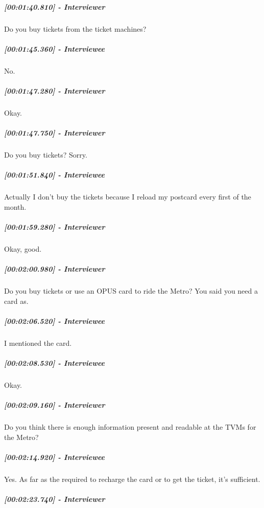 \documentclass[a4paper,12pt]{article}
\begin{document}
\hypertarget{interviewer-16}{%
\subparagraph{{[}00:01:40.810{]} - Interviewer}\label{interviewer-16}}

Do you buy tickets from the ticket machines?

\hypertarget{interviewee-9}{%
\subparagraph{{[}00:01:45.360{]} - Interviewee}\label{interviewee-9}}

No.

\hypertarget{interviewer-17}{%
\subparagraph{{[}00:01:47.280{]} - Interviewer}\label{interviewer-17}}

Okay.

\hypertarget{interviewer-18}{%
\subparagraph{{[}00:01:47.750{]} - Interviewer}\label{interviewer-18}}

Do you buy tickets? Sorry.

\hypertarget{interviewee-10}{%
\subparagraph{{[}00:01:51.840{]} - Interviewee}\label{interviewee-10}}

Actually I don't buy the tickets because I reload my postcard every
first of the month.

\hypertarget{interviewer-19}{%
\subparagraph{{[}00:01:59.280{]} - Interviewer}\label{interviewer-19}}

Okay, good.

\hypertarget{interviewer-20}{%
\subparagraph{{[}00:02:00.980{]} - Interviewer}\label{interviewer-20}}

Do you buy tickets or use an OPUS card to ride the Metro? You said you
need a card as.

\hypertarget{interviewee-11}{%
\subparagraph{{[}00:02:06.520{]} - Interviewee}\label{interviewee-11}}

I mentioned the card.

\hypertarget{interviewee-12}{%
\subparagraph{{[}00:02:08.530{]} - Interviewee}\label{interviewee-12}}

Okay.

\hypertarget{interviewer-21}{%
\subparagraph{{[}00:02:09.160{]} - Interviewer}\label{interviewer-21}}

Do you think there is enough information present and readable at the
TVMs for the Metro?

\hypertarget{interviewee-13}{%
\subparagraph{{[}00:02:14.920{]} - Interviewee}\label{interviewee-13}}

Yes. As far as the required to recharge the card or to get the ticket,
it's sufficient.

\hypertarget{interviewer-22}{%
\subparagraph{{[}00:02:23.740{]} - Interviewer}\label{interviewer-22}}
\end{document}
